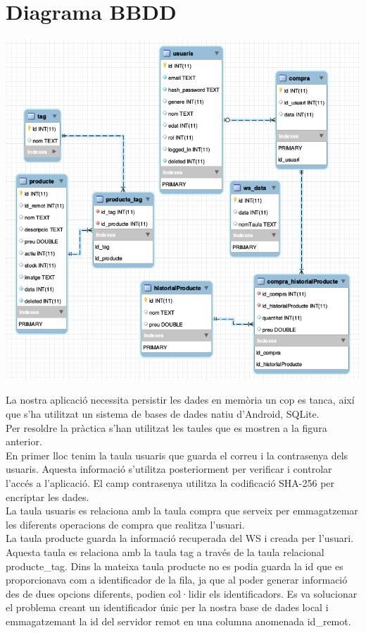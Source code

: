 \documentclass{article}
\begin{document}
\section{Diagrama BBDD}
\begin{center}
	\includegraphics[scale=0.5]{img/Android_DB_Schema.png}
\end{center}
La nostra aplicació necessita persistir les dades en memòria un cop es tanca, així que s'ha utilitzat un sistema de bases de dades natiu d'Android, SQLite.\\

Per resoldre la pràctica s'han utilitzat les taules que es mostren a la figura anterior.\\

En primer lloc tenim la taula usuaris que guarda el correu i la contrasenya dels usuaris. Aquesta informació s'utilitza posteriorment per verificar i controlar l'accés a l'aplicació. El camp contrasenya utilitza la codificació SHA-256 per encriptar les dades.\\

La taula usuaris es relaciona amb la taula compra que serveix per emmagatzemar les diferents operacions de compra que realitza l'usuari.\\

La taula producte guarda la informació recuperada del WS i creada per l'usuari. Aquesta taula es relaciona amb la taula tag a través de la taula relacional producte{\_}tag. Dins la mateixa taula producte no es podia guarda la id que es proporcionava com a identificador de la fila, ja que al poder generar informació des de dues opcions diferents, podien col·lidir els identificadors. Es va solucionar el problema creant un identificador únic per la nostra base de dades local i emmagatzemant la id del servidor remot en una columna anomenada id{\_}remot.
\end{document}
